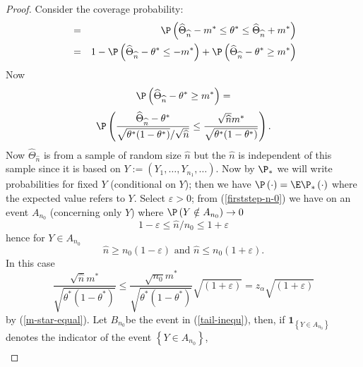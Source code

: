 \begin{proof}
Consider the coverage probability:%
\begin{eqnarray}
&=&\P \left( \widehat{\Theta}_{\widehat{n}}-m^{\ast }\leq \theta^*\leq \widehat{\Theta}_{\widehat{n}%
}+m^{\ast }\right)  \notag \\
&=&1-\P \left( \widehat{\Theta}_{\widehat{n}}-\theta^*\leq -m^{\ast }\right) +\P \left( \widehat{\Theta}%
_{\widehat{n}}-\theta^*\geq m^{\ast }\right)  \label{other-term}
\end{eqnarray}%
Now 
\begin{equation*}
\P \left( \widehat{\Theta}_{\widehat{n}}-\theta^*\geq m^{\ast }\right) =
\end{equation*}
\begin{equation}
\P \left( \frac{\widehat{\Theta}_{\widehat{n}}-\theta^*}{\sqrt{\theta^*(1-\theta^*)}/\sqrt{\widehat{n}}}\leq 
\frac{\sqrt{\widehat{n}}m^{\ast }}{\sqrt{\theta^*(1-\theta^*)}}\right) .  \label{tail-inequ}
\end{equation}%
Now $\widehat{\Theta}_{\widehat{n}}$ is from a sample of random size $\widehat{n}$ but the $%
\widehat{n}$ is independent of this sample since it is based on $Y:=\left(
Y_{1},\ldots ,Y_{n_{1}},\ldots \right) $. Now by $\P_{\ast }$ we will write
probabilities for fixed $Y$ (conditional on $Y$); then we have $\P \left(
\cdot \right) =\E\P_{\ast }\left( \cdot \right) $ where the expected value
refers to $Y$. Select $\varepsilon >0$; from (\ref{firststep-n-0}) we have
on an event $A_{n_{0}}$ (concerning only $Y$) where $\P \left( Y\notin
A_{n_{0}}\right) \rightarrow 0$ 
\begin{equation*}
1-\varepsilon \leq \widehat{n}/n_{0}\leq 1+\varepsilon
\end{equation*}%
hence for $Y\in A_{n_{0}}$ 
\begin{equation*}
\widehat{n}\geq n_{0}\left( 1-\varepsilon \right) \text{ and }\widehat{n}\leq
n_{0}\left( 1+\varepsilon \right) .
\end{equation*}%
In this case 
\begin{equation*}
\frac{\sqrt{\widehat{n}}m^{\ast }}{\sqrt{\theta^*(1-\theta^*)}}\leq \frac{\sqrt{n_{0}}m^{\ast }%
}{\sqrt{\theta^*(1-\theta^*)}}\sqrt{\left( 1+\varepsilon \right) }=z_{\alpha}%
\sqrt{\left( 1+\varepsilon \right) }
\end{equation*}%
by (\ref{m-star-equal}). Let $B_{n_{0}}$be the event in (\ref{tail-inequ}),
then, if $\mathbf{1}_{\left\{ Y\in A_{n_{0}}\right\} }$ denotes the
indicator of the event $\left\{ Y\in A_{n_{0}}\right\} $, 
\begin{eqnarray*}

\end{eqnarray*}
\end{proof}
